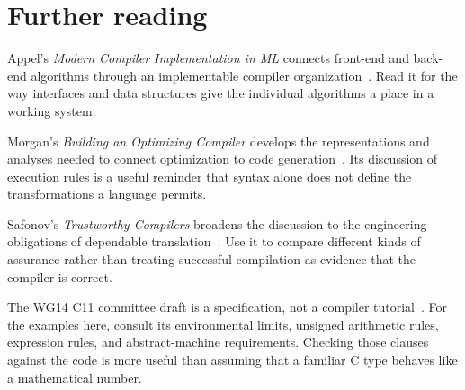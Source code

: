 \section{Further reading}
\label{sec:programs-meaning-reading}

Appel's \emph{Modern Compiler Implementation in ML} connects front-end and back-end algorithms through an implementable compiler organization~\cite{appel-1998-modern}.
Read it for the way interfaces and data structures give the individual algorithms a place in a working system.

Morgan's \emph{Building an Optimizing Compiler} develops the representations and analyses needed to connect optimization to code generation~\cite{morgan-1998-optimizing}.
Its discussion of execution rules is a useful reminder that syntax alone does not define the transformations a language permits.

Safonov's \emph{Trustworthy Compilers} broadens the discussion to the engineering obligations of dependable translation~\cite{safonov-2010-trustworthy}.
Use it to compare different kinds of assurance rather than treating successful compilation as evidence that the compiler is correct.

The WG14 C11 committee draft is a specification, not a compiler tutorial~\cite{wg14-2011-c11}.
For the examples here, consult its environmental limits, unsigned arithmetic rules, expression rules, and abstract-machine requirements.
Checking those clauses against the code is more useful than assuming that a familiar C type behaves like a mathematical number.
